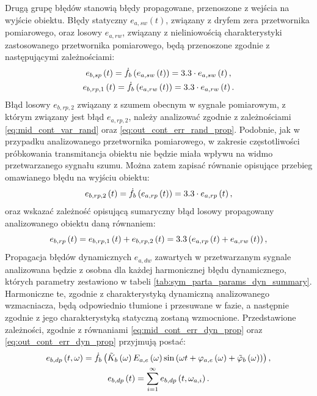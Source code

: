 Drugą grupę błędów stanowią błędy propagowane, przenoszone z wejścia na wyjście obiektu. Błędy statyczny $e_{a,sw}(t)$, związany z dryfem zera przetwornika pomiarowego, oraz losowy $e_{a,rw}$, związany z nieliniowością charakterystyki zastosowanego przetwornika pomiarowego, będą przenoszone zgodnie z następującymi zależnościami:
\begin{gather}
e_{b,sp} \left(t\right) = \dot{f}_{b} \left( e_{a,sw} \left(t\right) \right) = 3.3 \cdot e_{a,sw} \left(t\right) \label{eq:sym_partb_stat_prop_err}, \\
e_{b,rp,1} \left(t\right) = \dot{f}_{b} \left( e_{a,rw} \left(t\right) \right) = 3.3 \cdot e_{a,rw} \left(t\right) \label{eq:sym_partb_rand_prop_err_1}.
\end{gather}
Błąd losowy $e_{b,rp,2}$ związany z szumem obecnym w sygnale pomiarowym, z którym związany jest błąd $e_{a,rp,2}$, należy analizować zgodnie z zależnościami \eqref{eq:mid_cont_var_rand} oraz \eqref{eq:out_cont_err_rand_prop}. Podobnie, jak w przypadku analizowanego przetwornika pomiarowego, w zakresie częstotliwości próbkowania transmitancja obiektu nie będzie miała wpływu na widmo przetwarzanego sygnału szumu. Można zatem zapisać równanie opisujące przebieg omawianego błędu na wyjściu obiektu:
\begin{equation}
e_{b,rp,2} \left(t\right) = \dot{f}_{b} \left( e_{a,rp} \left(t\right) \right) = 3.3 \cdot e_{a,rp} \left(t\right) \label{eq:sym_partb_rand_prop_err_2},
\end{equation}
oraz wskazać zależność opisującą sumaryczny błąd losowy propagowany analizowanego obiektu daną równaniem:
\begin{equation}
e_{b,rp} \left(t\right) = e_{b,rp,1} \left(t\right) + e_{b,rp,2} \left(t\right) = 3.3 \left( e_{a,rp} \left(t\right) + e_{a,rw} \left(t\right) \right) \label{eq:sym_partb_rand_prop_err},
\end{equation}
Propagacja błędów dynamicznych $e_{a,dw}$ zawartych w przetwarzanym sygnale analizowana będzie z osobna dla każdej harmonicznej błędu dynamicznego, których parametry zestawiono w tabeli \ref{tab:sym_parta_params_dyn_summary}. Harmoniczne te, zgodnie z charakterystyką dynamiczną analizowanego wzmacniacza, będą odpowiednio tłumione i przesuwane w fazie, a następnie zgodnie z jego charakterystyką statyczną zostaną wzmocnione. Przedstawione zależności, zgodnie z równaniami \eqref{eq:mid_cont_err_dyn_prop} oraz \eqref{eq:out_cont_err_dyn_prop} przyjmują postać:
\begin{gather}
e_{b,dp} \left(t,\omega\right) = \dot{f}_{b} \left( \tilde{K}_{b} \left(\omega\right) E_{a,e} \left(\omega\right) \sin \left( \omega t + \varphi_{a,e} \left(\omega\right) + \tilde{\varphi}_{b} \left(\omega\right) \right) \right) \label{eq:sym_partb_dyn_prop_err},\\
e_{b,dp} \left(t\right) = \sum _{i = 1} ^{\infty} e_{b,dp} \left(t,\omega_{a,i}\right) \label{eq:sym_partb_dyn_prop_sum}.
\end{gather}

